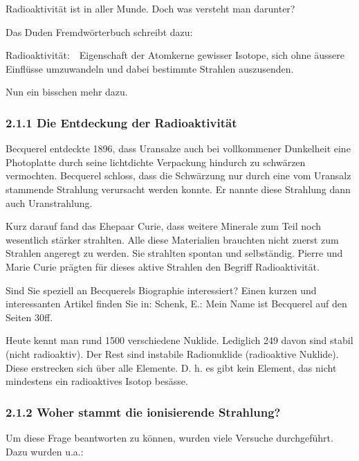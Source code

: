 \documentclass[12pt,a4paper,twoside]{article}
\begin{document}
\bigskip

{\quotedblbase}Radioaktivität{\quotedblbase} ist in aller Munde. Doch was versteht man darunter?

Das Duden Fremdwörterbuch schreibt dazu:

Radioaktivität:\ \ Eigenschaft der Atomkerne gewisser Isotope, sich ohne äussere Einflüsse umzuwandeln und dabei bestimmte Strahlen auszusenden.

Nun ein bisschen mehr dazu.

\subsubsection{2.1.1 Die Entdeckung der Radioaktivität}

\bigskip

Becquerel entdeckte 1896, dass Uransalze auch bei vollkommener Dunkelheit eine Photoplatte durch seine lichtdichte Verpackung hindurch zu schwärzen vermochten. Becquerel schloss, dass die Schwärzung nur durch eine vom Uransalz stammende Strahlung verursacht werden konnte. Er nannte diese Strahlung dann auch {\quotedblbase}Uranstrahlung{\quotedblbase}.

Kurz darauf fand das Ehepaar Curie, dass weitere Minerale zum Teil noch wesentlich stärker strahlten. Alle diese Materialien brauchten nicht zuerst zum Strahlen angeregt zu werden. Sie strahlten spontan und selbständig. Pierre und Marie Curie prägten für dieses {\quotedblbase}aktive{\quotedblbase} Strahlen den Begriff {\quotedblbase}Radioaktivität{\quotedblbase}.

Sind Sie speziell an Becquerels Biographie interessiert? Einen kurzen und interessanten Artikel finden Sie in: Schenk, E.: {\quotedblbase}Mein Name ist Becquerel{\quotedblbase} auf den Seiten 30ff.

Heute kennt man rund 1500 verschiedene Nuklide. Lediglich 249 davon sind stabil (nicht radioaktiv). Der Rest sind instabile Radionuklide (radioaktive Nuklide). Diese erstrecken sich über alle Elemente. D. h. es gibt kein Element, das nicht mindestens ein radioaktives Isotop besässe.

\subsubsection{2.1.2 Woher stammt die ionisierende Strahlung?}

\bigskip

Um diese Frage beantworten zu können, wurden viele Versuche durchgeführt. Dazu wurden u.a.:
\end{document}
